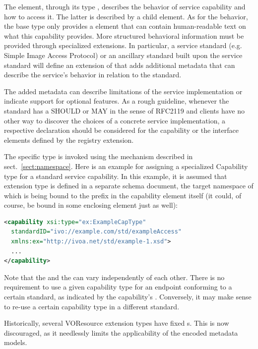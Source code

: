 \documentclass[11pt,a4paper]{ivoa}
\begin{document}
The  element, through its type ,
describes the behavior of service capability and how to access it.  The
latter is described by a child  element.  As for the
behavior, the base  type only provides a
 element that can contain human-readable text on what
this capability provides.  More structured behavioral information must
be provided through specialized  extensions.  In
particular, a service standard (e.g. Simple Image
Access Protocol) or an ancillary standard built upon the service
standard will define an extension of  that
adds additional metadata that can describe the service's behavior in
relation to the standard. 

The added metadata can describe
limitations of the service implementation or indicate support for
optional features.  As a rough guideline, whenever the standard has a
SHOULD or MAY in the sense of RFC2119 and clients have no other way to
discover the choices of a concrete service implementation, a respective
declaration should be considered for the capability or the interface
elements defined by the registry extension.

The specific  type is invoked
using the  mechanism described in
sect.~\ref{sect:namespace}.
Here is an example for assigning a specialized Capability type for
a standard service capability.  In this example, it is assumed that
 extension type is defined in a separate
schema document, the target namespace of which is being bound to the
 prefix in the capability element itself (it could, of
course, be bound in some enclosing element just as well):

\begin{lstlisting}[language=XML]
<capability xsi:type="ex:ExampleCapType"
  standardID="ivo://example.com/std/exampleAccess"
  xmlns:ex="http://ivoa.net/std/example-1.xsd">
  ...
</capability>
\end{lstlisting}

Note that the  and the  can vary
independently of each other.  There is no requirement to use a given
capability type for an endpoint conforming to a certain standard, as
indicated by the capability's . Conversely,
it may make sense to re-use a certain capability type in a different
standard. 

Historically, several VOResource extension types have
fixed s.  This is now discouraged, as it needlessly
limits the applicability of the encoded metadata models.
\end{document}
